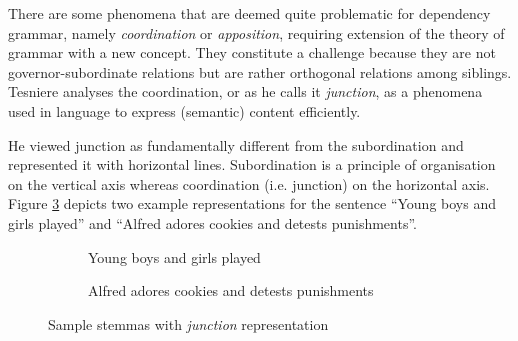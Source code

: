     There are some phenomena that are deemed quite problematic for dependency grammar, namely \textit{coordination} or \textit{apposition}, requiring extension of the theory of grammar with a new concept. They constitute a challenge because they are not governor-subordinate relations but are rather orthogonal relations among siblings. Tesniere analyses the coordination, or as he calls it \textit{junction}, as a phenomena used in language to express (semantic) content efficiently. 
    
    He viewed junction as fundamentally different from the subordination and represented it with horizontal lines. Subordination is a principle of organisation on the vertical axis whereas coordination (i.e. junction) on the horizontal axis. Figure \ref{fig:stemma3} depicts two example representations for the sentence ``Young boys and girls played'' and ``Alfred adores cookies and detests punishments''. 

    \begin{figure}[!ht]
        \centering
        \begin{subfigure}{.35\textwidth}
            \centering
            \caption{Young boys and girls played}
            \label{fig:stemma3-sub1}
        \end{subfigure}%
        \begin{subfigure}{.65\textwidth}
            \centering
            \caption{Alfred adores cookies and detests punishments}
            \label{fig:stemma3-sub2}
        \end{subfigure}
        \caption{Sample stemmas with \textit{junction} representation}
        \label{fig:stemma3}
    \end{figure}


